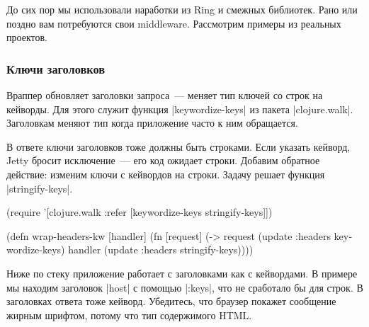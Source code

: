 
До сих пор мы использовали наработки из Ring и смежных библиотек. Рано или
поздно вам потребуются свои middleware. Рассмотрим примеры из реальных проектов.

\subsubsection*{Ключи заголовков}


Враппер обновляет заголовки запроса~--- меняет тип ключей со строк на
кейворды. Для этого служит функция \spverb|keywordize-keys| из пакета
\spverb|clojure.walk|. Заголовкам меняют тип когда приложение часто к ним
обращается.


В ответе ключи заголовков тоже должны быть строками. Если указать кейворд, Jetty
бросит исключение~--- его код ожидает строки. Добавим обратное действие: изменим
ключи с кейвордов на строки. Задачу решает функция \spverb|stringify-keys|.


\begin{english}
  \begin{clojure}
(require '[clojure.walk :refer
           [keywordize-keys stringify-keys]])

(defn wrap-headers-kw [handler]
  (fn [request]
    (-> request
        (update :headers keywordize-keys)
        handler
        (update :headers stringify-keys))))
  \end{clojure}
\end{english}

Ниже по стеку приложение работает с заголовками как с кейвордами. В примере мы
находим заголовок \spverb|host| с помощью \spverb|:keys|, что не сработало бы
для строк. В заголовках ответа тоже кейворд. Убедитесь, что браузер покажет
сообщение жирным шрифтом, потому что тип содержимого HTML.

\begin{english}
\end{english}

